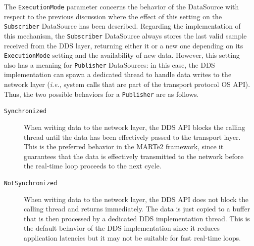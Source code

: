 The \texttt{ExecutionMode} parameter concerns the behavior of the DataSource with respect to the previous discussion where the effect of this setting on the \texttt{Subscriber} DataSource has been described. Regarding the implementation of this mechanism, the \texttt{Subscriber} DataSource always stores the last valid sample received from the DDS layer, returning either it or a new one depending on its \texttt{ExecutionMode} setting and the availability of new data. However, this setting also has a meaning for \texttt{Publisher} DataSources: in this case, the DDS implementation can spawn a dedicated thread to handle data writes to the network layer (\emph{i.e.}, system calls that are part of the transport protocol OS API). Thus, the two possible behaviors for a \texttt{Publisher} are as follows.
\begin{description}
  \item[\texttt{Synchronized}] When writing data to the network layer, the DDS API blocks the calling thread until the data has been effectively passed to the transport layer. This is the preferred behavior in the MARTe2 framework, since it guarantees that the data is effectively transmitted to the network before the real-time loop proceeds to the next cycle.
  \item[\texttt{NotSynchronized}] When writing data to the network layer, the DDS API does not block the calling thread and returns immediately. The data is just copied to a buffer that is then processed by a dedicated DDS implementation thread. This is the default behavior of the DDS implementation since it reduces application latencies but it may not be suitable for fast real-time loops.
\end{description}

